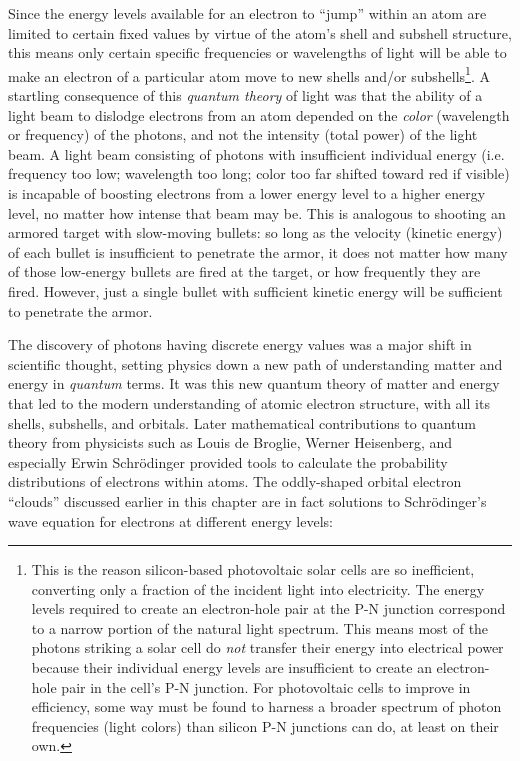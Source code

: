 Since the energy levels available for an electron to ``jump'' within an atom are limited to certain fixed values by virtue of the atom's shell and subshell structure, this means only certain specific frequencies or wavelengths of light will be able to make an electron of a particular atom move to new shells and/or subshells\footnote{This is the reason silicon-based photovoltaic solar cells are so inefficient, converting only a fraction of the incident light into electricity.  The energy levels required to create an electron-hole pair at the P-N junction correspond to a narrow portion of the natural light spectrum.  This means most of the photons striking a solar cell do \textit{not} transfer their energy into electrical power because their individual energy levels are insufficient to create an electron-hole pair in the cell's P-N junction.  For photovoltaic cells to improve in efficiency, some way must be found to harness a broader spectrum of photon frequencies (light colors) than silicon P-N junctions can do, at least on their own.}.  A startling consequence of this \textit{quantum theory} of light was that the ability of a light beam to dislodge electrons from an atom depended on the \textit{color} (wavelength or frequency) of the photons, and not the intensity (total power) of the light beam.  A light beam consisting of photons with insufficient individual energy (i.e. frequency too low; wavelength too long; color too far shifted toward red if visible) is incapable of boosting electrons from a lower energy level to a higher energy level, no matter how intense that beam may be.  This is analogous to shooting an armored target with slow-moving bullets: so long as the velocity (kinetic energy) of each bullet is insufficient to penetrate the armor, it does not matter how many of those low-energy bullets are fired at the target, or how frequently they are fired.  However, just a single bullet with sufficient kinetic energy will be sufficient to penetrate the armor.   

\filbreak

The discovery of photons having discrete energy values was a major shift in scientific thought, setting physics down a new path of understanding matter and energy in \textit{quantum} terms.  It was this new quantum theory of matter and energy that led to the modern understanding of atomic electron structure, with all its shells, subshells, and orbitals.  Later mathematical contributions to quantum theory from physicists such as Louis de Broglie, Werner Heisenberg, and especially Erwin Schr\"odinger provided tools to calculate the probability distributions of electrons within atoms.  The oddly-shaped orbital electron ``clouds'' discussed earlier in this chapter are in fact solutions to Schr\"odinger's wave equation for electrons at different energy levels:      

